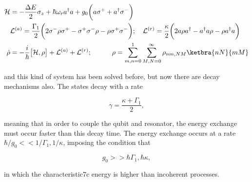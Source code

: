       \begin{equation}\label{ar1}
        \begin{aligned}
          \mathcal{H} & ={-\frac{\Delta E}{2}\sigma_z}+{{\hbar\omega_r}a^\dagger a} + {g_0\bigg({a\sigma^+}+{a^{\dagger}\sigma^-}\bigg)}\\
          &\mathcal{L}^{(a)} = \frac{\Gamma_1}{2}\bigg(2\sigma^{-}\rho \sigma^{+}-\sigma^{+}\sigma^{-}\rho-\rho \sigma^{+}\sigma^{-}\bigg);\quad\mathcal{L}^{(r)} = \frac{\kappa}{2}\bigg(2a\rho a^{\dagger}-a^{\dagger}a\rho-\rho a^{\dagger}a\bigg)\\
          \dot{\rho} & = -\frac{i}{\hbar}\big[\mathcal{H},\rho\big]+\mathcal{L}^{(a)}+\mathcal{L}^{(r)};\quad\quad\quad \rho = \sum_{m,n=0}^{1}\sum_{M,N=0}^{\infty}\rho_{nm,NM}\ketbra{nN}{mM}\\
        \end{aligned}
      \end{equation}

      \noindent and this kind of system has been solved before, but now there are decay mechanisms also. The states decay with a
      rate

\begin{equation}\label{ardecay}
  \gamma=\frac{\kappa+\Gamma_1}{2},
\end{equation}

\noindent meaning that in order to couple the qubit and resonator, the energy exchange must occur faster than this decay time. The
energy exchange occurs at a rate $ \hbar/g_0 << 1/\Gamma_1,1/\kappa$, imposing the condition that

\begin{equation}\label{arD}
  g_0>>\hbar\Gamma_1,\hbar\kappa,
\end{equation}

\noindent in which the characteristic7c energy is higher than incoherent processes.

\begin{figure}[h]
   
\end{figure}

\newpage



